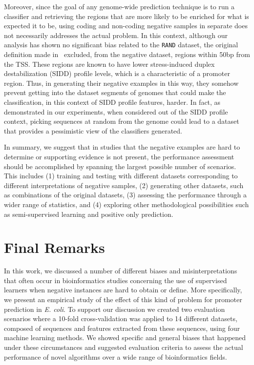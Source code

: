 \documentclass[conference]{IEEEtran}
\begin{document}
Moreover, since the goal of any genome-wide prediction technique is to run a classifier and retrieving the regions that are more likely to be enriched for what  is expected it to be, using coding and non-coding negative samples in separate does not necessarily addresses the actual problem. In this context, although our analysis has shown no significant bias related to the {\tt RAND} dataset, the original definition made in~\cite{bland2010} excluded, from the negative dataset, regions within 50bp from the TSS. These regions are known to have lower stress-induced duplex destabilization (SIDD) profile levels, which is a characteristic of a promoter region. Thus, in generating their negative examples in this way, they somehow prevent getting into the dataset segments of genomes that could make the classification, in this context of SIDD profile features, harder. In fact, as demonstrated  in our experiments, when considered out of the SIDD profile context, picking sequences at random from the genome could lead to a dataset that provides a pessimistic view of the classifiers generated.

In summary, we suggest that in studies that the negative examples are hard to determine or supporting evidence is not present, the performance assessment should be accomplished by spanning the largest possible number of scenarios. This includes (1) training and testing with different datasets corresponding to different interpretations of negative samples, (2) generating other datasets, such as combinations of the original datasets, (3) assessing the performance through a wider range of statistics, and (4) exploring other methodological possibilities such as semi-supervised learning and positive only prediction.

\section{Final Remarks}
\label{sec:final}

In this work, we discussed a number of different biases and misinterpretations that often occur in bioinformatics studies concerning the use of supervised learners when negative instances are hard to obtain or define. More specifically, we present an empirical study of the effect of this kind of problem for promoter prediction in {\it E. coli}. To support our discussion we created two evaluation scenarios where a 10-fold cross-validation was applied to 14 different datasets, composed of sequences and features extracted from these sequences, using four machine learning methods. We showed specific and general biases that happened under these circumstances and suggested evaluation criteria to assess the actual performance of novel algorithms over a wide range of bioinformatics fields.
\end{document}
